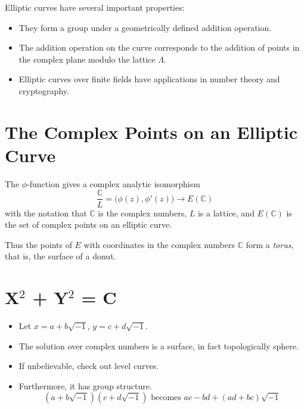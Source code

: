 Elliptic curves have several important properties:

\begin{itemize}
	\item They form a group under a geometrically defined addition operation.
	\item The addition operation on the curve corresponds to the addition of points in the complex plane modulo the lattice $\Lambda$.
	\item Elliptic curves over finite fields have applications in number theory and cryptography.
\end{itemize}


\newpage
\section*{The Complex Points on an Elliptic Curve}

The \(\phi\)-function gives a complex analytic isomorphism
\[
\frac{\mathbb{C}}{L} = \big(\phi(z),\phi'(z)\big) \rightarrow E(\mathbb{C})
\]
with the notation that \( \mathbb{C} \) is the complex numbers, \( L \) is a lattice, and \( E(\mathbb{C}) \) is the set of complex points on an elliptic curve.


Thus the points of \( E \) with coordinates in the complex numbers \( \mathbb{C} \) form a \textit{torus}, that is, the surface of a donut.


\section*{X\(^2\) + Y\(^2\) = C}

\begin{itemize}
	\item Let \( x = a + b\sqrt{-1} \), \( y = c + d\sqrt{-1} \).
	\item The solution over complex numbers is a surface, in fact topologically sphere.
	\item If unbelievable, check out level curves.
	\item Furthermore, it has group structure.
	\[ (a + b\sqrt{-1})(c + d\sqrt{-1}) \text{ becomes } ac-bd + (ad+bc)\sqrt{-1} \]
\end{itemize}

